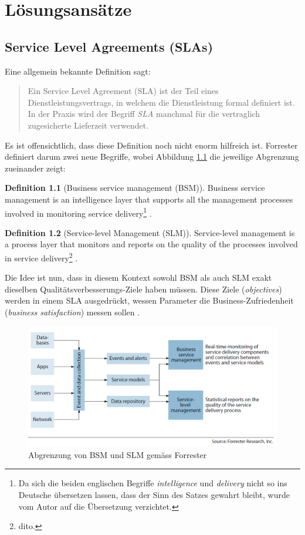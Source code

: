\documentclass[11pt,listof=totoc]{scrreprt} %
\theoremstyle{definition}
\newtheorem{definition}{Definition}
\begin{document}
\chapter{Lösungsansätze}

\section{Service Level Agreements (SLAs)}
Eine allgemein bekannte Definition sagt:
\begin{quote}
Ein Service Level Agreement (SLA) ist der Teil eines Dienstleistungsvertrags, in welchem die Dienstleistung formal definiert ist. In der Praxis wird der Begriff {\em SLA} manchmal für die vertraglich zugesicherte Lieferzeit verwendet. \cite{wiki:sla}
\end{quote}

Es ist offensichtlich, dass diese Definition noch nicht enorm hilfreich ist. Forrester definiert darum zwei neue Begriffe, wobei Abbildung \ref{forr} die jeweilige Abgrenzung zueinander zeigt:

\begin{definition}[Business service management (BSM)] Business service management is an intelligence layer that supports all the management processes involved in monitoring service delivery\footnote{Da sich die beiden englischen Begriffe {\em intelligence} und {\em delivery} nicht so ins Deutsche übersetzen lassen, dass der Sinn des Satzes gewahrt bleibt, wurde vom Autor auf die Übersetzung verzichtet.} \cite{forrester:slaBestPractices}.
\end{definition}

\begin{definition}[Service-level Management (SLM)]
Service-level management is a process layer that monitors and reports on the quality of
the processes involved in service delivery\footnote{dito.} \cite{forrester:slaBestPractices}.
\end{definition}

Die Idee ist nun, dass in diesem Kontext sowohl BSM als auch SLM exakt dieselben Qualitätsverbesserungs-Ziele haben müssen. Diese Ziele ({\em objectives}) werden in einem SLA ausgedrückt, wessen Parameter die Business-Zufriedenheit ({\em business satisfaction}) messen sollen \cite{forrester:slaBestPractices, EllisKauferstein200311}.

\begin{figure}
\label{forr}
\caption{Abgrenzung von BSM und SLM gemäss Forrester}
\includegraphics[scale=0.47]{biltli/forrester_bsm_slm.png}
\end{figure}
\end{document}
